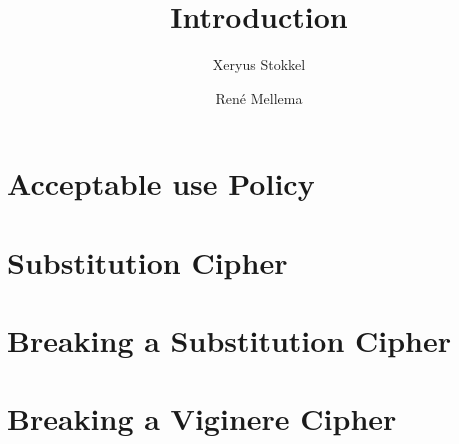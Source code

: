 \documentclass[a4paper, 10pt]{article}
\title{Introduction}
\author{Xeryus Stokkel \and Ren\'e Mellema}
\date{} %
\begin{document}
\maketitle

\section{Acceptable use Policy}


\section{Substitution Cipher}


\section{Breaking a Substitution Cipher}


\section{Breaking a Viginere Cipher}

\end{document}
